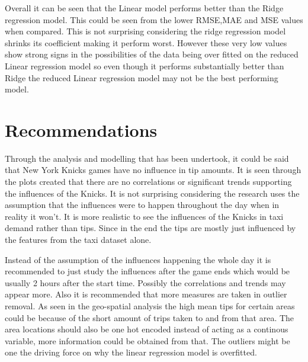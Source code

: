 \documentclass[11pt]{article}
\begin{document}
Overall it can be seen that the Linear model performs better than the Ridge regression model. This could be seen from the lower RMSE,MAE and MSE values when compared. This is not surprising considering the ridge regression model shrinks its coefficient making it perform worst. However these very low values show strong signs in the possibilities of the data being over fitted on the reduced Linear regression model so even though it performs substantially better than Ridge the reduced Linear regression model may not be the best performing model. 

\section{Recommendations}
Through the analysis and modelling that has been undertook, it could be said that New York Knicks games have no influence in tip amounts. It is seen through the plots created that there are no correlations or significant trends supporting the influences of the Knicks. It is not surprising considering the research uses the assumption that the influences were to happen throughout the day when in reality it won't. It is more realistic to see the influences of the Knicks in taxi demand rather than tips. Since in the end the tips are mostly just influenced by the features from the taxi dataset alone. 

Instead of the assumption of the influences happening the whole day it is recommended to just study the influences after the game ends which would be usually 2 hours after the start time. Possibly the correlations and trends may appear more. Also it is recommended that more measures are taken in outlier removal. As seen in the geo-spatial analysis the high mean tips for certain areas could be because of the short amount of trips taken to and from that area. The area locations should also be one hot encoded instead of acting as a continous variable, more information could be obtained from that. The outliers might be one the driving force on why the linear regression model is overfitted.



\clearpage

\printbibliography
\end{document}
